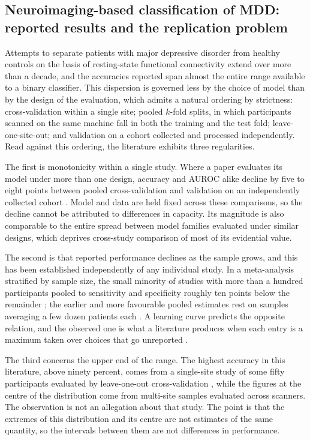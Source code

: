 \subsection{Neuroimaging-based classification of MDD: reported results and the replication problem}
\label{sec:related:mdd}

Attempts to separate patients with major depressive disorder from healthy controls on the basis of
resting-state functional connectivity extend over more than a decade, and the accuracies reported
span almost the entire range available to a binary classifier. This dispersion is governed less by
the choice of model than by the design of the evaluation, which admits a natural ordering by
strictness: cross-validation within a single site; pooled $k$-fold splits, in which participants
scanned on the same machine fall in both the training and the test fold; leave-one-site-out; and
validation on a cohort collected and processed independently. Read against this ordering, the
literature exhibits three regularities.

The first is monotonicity within a single study. Where a paper evaluates its model under more than
one design, accuracy and AUROC alike decline by five to eight points between pooled
cross-validation and validation on an independently collected cohort \citep{gallo2023,
liu2024lgmf}. Model and data are held fixed across these comparisons, so the decline cannot be
attributed to differences in capacity. Its magnitude is also comparable to the entire spread
between model families evaluated under similar designs, which deprives cross-study comparison of
most of its evidential value.

The second is that reported performance declines as the sample grows, and this has been established
independently of any individual study. In a meta-analysis stratified by sample size, the small
minority of studies with more than a hundred participants pooled to sensitivity and specificity
roughly ten points below the remainder \citep{chen2023meta}; the earlier and more favourable pooled
estimates rest on samples averaging a few dozen patients each \citep{kambeitz2017}. A learning
curve predicts the opposite relation, and the observed one is what a literature produces when each
entry is a maximum taken over choices that go unreported \citep{schnack2016, marek2022}.

The third concerns the upper end of the range. The highest accuracy in this literature, above
ninety percent, comes from a single-site study of some fifty participants evaluated by
leave-one-out cross-validation \citep{zeng2012}, while the figures at the centre of the
distribution come from multi-site samples evaluated across scanners. The observation is not an
allegation about that study. The point is that the extremes of this distribution and its centre
are not estimates of the same quantity, so the intervals between them are not differences in
performance.

